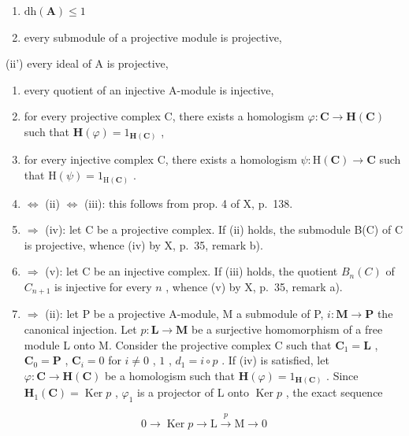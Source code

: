 \begin{enumerate}
\def\labelenumi{(\roman{enumi})}
\item
  \(\mathrm{dh}(\mathbf{A})\leqslant 1\)
\item
  every submodule of a projective module is projective,
\end{enumerate}

(ii') every ideal of A is projective,

\begin{enumerate}
\def\labelenumi{(\roman{enumi})}
\setcounter{enumi}{2}
\item
  every quotient of an injective A-module is injective,
\item
  for every projective complex C, there exists a homologism \(\varphi : \mathbf{C} \to \mathbf{H}(\mathbf{C})\) such that \(\mathbf{H}(\varphi) = 1_{\mathbf{H}(\mathbf{C})}\) ,
\item
  for every injective complex C, there exists a homologism \(\psi : \mathrm{H}(\mathbf{C}) \to \mathbf{C}\) such that \(\mathrm{H}(\psi) = 1_{\mathrm{H}(\mathbf{C})}\) .
\item
  \(\Leftrightarrow\) (ii) \(\Leftrightarrow\) (iii): this follows from prop. 4 of X, p.~138.
\item
  \(\Rightarrow\) (iv): let C be a projective complex. If (ii) holds, the submodule B(C) of C is projective, whence (iv) by X, p.~35, remark b).
\item
  \(\Rightarrow\) (v): let C be an injective complex. If (iii) holds, the quotient \(B_{n}(C)\) of \(C_{n+1}\) is injective for every \(n\) , whence (v) by X, p.~35, remark a).
\item
  \(\Rightarrow\) (ii): let P be a projective A-module, M a submodule of P, \(i: \mathbf{M} \to \mathbf{P}\) the canonical injection. Let \(p: \mathbf{L} \to \mathbf{M}\) be a surjective homomorphism of a free module L onto M. Consider the projective complex C such that \(\mathbf{C}_1 = \mathbf{L}\) , \(\mathbf{C}_0 = \mathbf{P}\) , \(\mathbf{C}_i = 0\) for \(i \neq 0\) , \(1\) , \(d_1 = i \circ p\) . If (iv) is satisfied, let \(\varphi: \mathbf{C} \to \mathbf{H}(\mathbf{C})\) be a homologism such that \(\mathbf{H}(\varphi) = 1_{\mathbf{H}(\mathbf{C})}\) . Since \(\mathbf{H}_1(\mathbf{C}) = \operatorname{Ker} p\) , \(\varphi_1\) is a projector of L onto \(\operatorname{Ker} p\) , the exact sequence
\end{enumerate}

\[
0 \rightarrow \operatorname{Ker} p \rightarrow \mathrm{L} \xrightarrow {p} \mathrm{M} \rightarrow 0
\]

